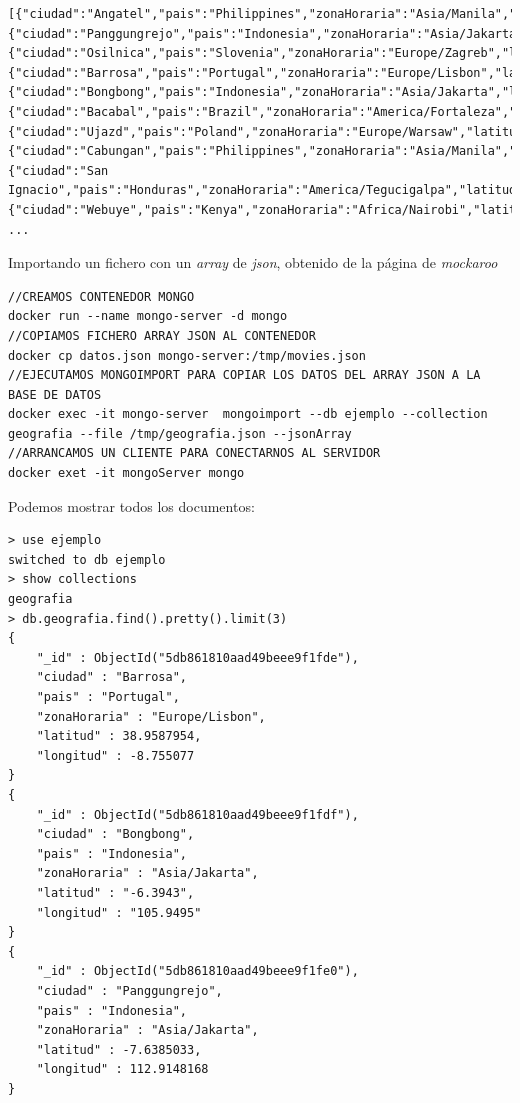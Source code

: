 \documentclass[4paper]{article}
\begin{document}
\begin{lstlisting}
[{"ciudad":"Angatel","pais":"Philippines","zonaHoraria":"Asia/Manila","latitud":15.8137804,"longitud":120.3404633},
{"ciudad":"Panggungrejo","pais":"Indonesia","zonaHoraria":"Asia/Jakarta","latitud":-7.6385033,"longitud":112.9148168},
{"ciudad":"Osilnica","pais":"Slovenia","zonaHoraria":"Europe/Zagreb","latitud":45.5291637,"longitud":14.6984205},
{"ciudad":"Barrosa","pais":"Portugal","zonaHoraria":"Europe/Lisbon","latitud":38.9587954,"longitud":-8.755077},
{"ciudad":"Bongbong","pais":"Indonesia","zonaHoraria":"Asia/Jakarta","latitud":"-6.3943","longitud":"105.9495"},
{"ciudad":"Bacabal","pais":"Brazil","zonaHoraria":"America/Fortaleza","latitud":-4.2221443,"longitud":-44.7855844},
{"ciudad":"Ujazd","pais":"Poland","zonaHoraria":"Europe/Warsaw","latitud":51.6113555,"longitud":19.8982345},
{"ciudad":"Cabungan","pais":"Philippines","zonaHoraria":"Asia/Manila","latitud":16.289185,"longitud":119.90559},
{"ciudad":"San Ignacio","pais":"Honduras","zonaHoraria":"America/Tegucigalpa","latitud":14.6546241,"longitud":-87.0399404},
{"ciudad":"Webuye","pais":"Kenya","zonaHoraria":"Africa/Nairobi","latitud":0.5992059,"longitud":34.779603}, ...
\end{lstlisting}

Importando un fichero con un \emph{array} de \emph{json}, obtenido de la página de \emph{mockaroo}
\begin{lstlisting}
//CREAMOS CONTENEDOR MONGO
docker run --name mongo-server -d mongo
//COPIAMOS FICHERO ARRAY JSON AL CONTENEDOR
docker cp datos.json mongo-server:/tmp/movies.json
//EJECUTAMOS MONGOIMPORT PARA COPIAR LOS DATOS DEL ARRAY JSON A LA BASE DE DATOS
docker exec -it mongo-server  mongoimport --db ejemplo --collection geografia --file /tmp/geografia.json --jsonArray
//ARRANCAMOS UN CLIENTE PARA CONECTARNOS AL SERVIDOR
docker exet -it mongoServer mongo
\end{lstlisting}

\newpage

Podemos mostrar todos los documentos:
\begin{lstlisting}
> use ejemplo
switched to db ejemplo
> show collections
geografia
> db.geografia.find().pretty().limit(3)
{
	"_id" : ObjectId("5db861810aad49beee9f1fde"),
	"ciudad" : "Barrosa",
	"pais" : "Portugal",
	"zonaHoraria" : "Europe/Lisbon",
	"latitud" : 38.9587954,
	"longitud" : -8.755077
}
{
	"_id" : ObjectId("5db861810aad49beee9f1fdf"),
	"ciudad" : "Bongbong",
	"pais" : "Indonesia",
	"zonaHoraria" : "Asia/Jakarta",
	"latitud" : "-6.3943",
	"longitud" : "105.9495"
}
{
	"_id" : ObjectId("5db861810aad49beee9f1fe0"),
	"ciudad" : "Panggungrejo",
	"pais" : "Indonesia",
	"zonaHoraria" : "Asia/Jakarta",
	"latitud" : -7.6385033,
	"longitud" : 112.9148168
}
\end{lstlisting}
\end{document}
